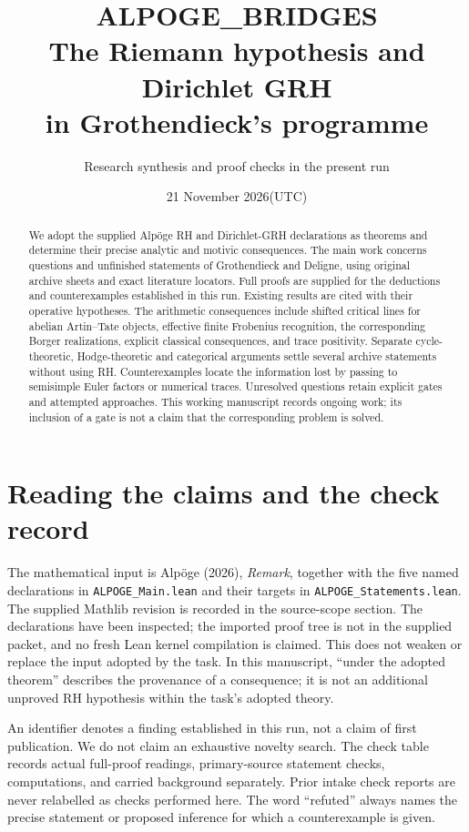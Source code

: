 \documentclass[11pt,a4paper]{article}
\title{ALPOGE\_BRIDGES\\The Riemann hypothesis and Dirichlet GRH\\in Grothendieck's programme}
\author{Research synthesis and proof checks in the present run}
\date{21 November 2026\quad\textnormal{(UTC)}}
\theoremstyle{definition}\newtheorem{definition}[theorem]{Definition}
\theoremstyle{remark}\newtheorem{remark}[theorem]{Remark}
\begin{document}
\maketitle
\begin{abstract}
We adopt the supplied Alp\"oge RH and Dirichlet-GRH declarations as
theorems and determine their precise analytic and motivic consequences.
The main work concerns questions and unfinished statements of Grothendieck
and Deligne, using original archive sheets and exact literature locators.
Full proofs are supplied for the deductions and counterexamples established
in this run. Existing results are cited with their operative hypotheses.
The arithmetic consequences include shifted critical lines for abelian
Artin--Tate objects, effective finite Frobenius recognition, the corresponding
Borger realizations, explicit classical consequences, and trace positivity.
Separate cycle-theoretic, Hodge-theoretic and categorical arguments settle
several archive statements without using RH. Counterexamples locate the
information lost by passing to semisimple Euler factors or numerical traces.
Unresolved questions retain explicit gates and attempted approaches.
This working manuscript records ongoing work; its inclusion of a gate
is not a claim that the corresponding problem is solved.
\end{abstract}

\section*{Reading the claims and the check record}
The mathematical input is Alp\"oge (2026), \emph{Remark}, together with
the five named declarations in \nolinkurl{ALPOGE_Main.lean} and their
targets in \nolinkurl{ALPOGE_Statements.lean}. The supplied Mathlib revision
is recorded in the source-scope section. The declarations have been
inspected; the imported proof tree is not in the supplied packet, and
no fresh Lean kernel compilation is claimed. This does not weaken or
replace the input adopted by the task. In this manuscript, ``under the
adopted theorem'' describes the provenance of a consequence; it is not
an additional unproved RH hypothesis within the task's adopted theory.

An identifier denotes a finding established in this run, not a claim
of first publication. We do not claim an exhaustive novelty search.
The check table records actual full-proof readings, primary-source
statement checks, computations, and carried background separately.
Prior intake check reports are never relabelled as checks performed
here. The word ``refuted'' always names the precise statement or
proposed inference for which a counterexample is given.
\end{document}
